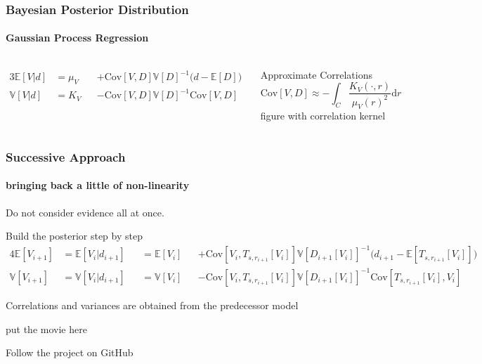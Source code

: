 \documentclass[aspectratio=169]{beamer}
\newcommand\Mean[1]{\mathbb{E}\!\left[#1\right]}
\newcommand\Var[1]{\mathbb{V}\!\left[#1\right]}
\newcommand\Cov[2]{\mathrm{Cov}\!\left[#1,#2\right]}
\begin{document}
\begin{frame}
    \frametitle{Bayesian Posterior Distribution}
    \framesubtitle{Gaussian Process Regression}

\begin{columns}
    \begin{alignat}{3}
        \Mean{V|d} &= \mu_V &&+ \Cov{V}{D} \Var{D}^{-1} \big( d - \Mean{D} \big)
        \\
        \Var{V|d}  &= K_V   &&- \Cov{V}{D} \Var{D}^{-1} \Cov{V}{D}
    \end{alignat}

    Approximate Correlations
    \begin{equation}
        \Cov{V}{D} \approx -\int_C \frac {K_V(\cdot,r)}{\mu_V(r)^2} \mathrm d r
    \end{equation}
    figure with correlation kernel
\end{columns}

\end{frame}

\begin{frame}
    \frametitle{Successive Approach}
    \framesubtitle{bringing back a little of non-linearity}

    Do not consider evidence all at once.

    Build the posterior step by step
    \begin{alignat}{4}
        \Mean{V_{i+1}} &=
        \Mean{V_i|d_{i+1}} &&=
        \Mean{V_i} &&+ \Cov{V_i}{T_{s,r_{i+1}}[V_i]} \Var{D_{i+1}[V_i]}^{-1} \big(d_{i+1} - \Mean{T_{s,r_{i+1}}[V_i]} \! \big)
        \\
        \Var{V_{i+1}} &=
        \Var{V_i|d_{i+1}} &&=
        \Var{V_i}  &&- \Cov{V_i}{T_{s,r_{i+1}}[V_i]} \Var{D_{i+1}[V_i]}^{-1} \Cov{T_{s,r_{i+1}}[V_i]}{V_i}
    \end{alignat}

    Correlations and variances are obtained from the predecessor model

\end{frame}


\begin{frame}[plain]
    put the movie here
\end{frame}

\begin{frame}
    \hspace{15mm} Follow the project on GitHub \\[1cm]
    \hfill {} \hspace{20mm}
\end{frame}
\end{document}
